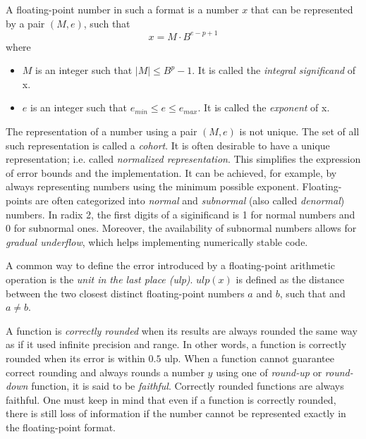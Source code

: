 A floating-point number in such a format is a number $x$ that can be represented by a pair $(M,e)$, such that
\begin{equation}
	x = M \cdot B^{e-p+1}
\end{equation}
where
\begin{itemize}
	\item $M$ is an integer such that $|M| \le B^{p}-1$. It is called the \textit{integral significand} of x.
	\item $e$ is an integer such that $e_{min} \le e \le e_{max}$. It is called the \textit{exponent} of x.
\end{itemize}
The representation of a number using a pair $(M, e)$ is not unique.
The set of all such representation is called a \textit{cohort}.
It is often desirable to have a unique representation; i.e.  called \textit{normalized representation}.
This simplifies the expression of error bounds and the implementation.
It can be achieved, for example, by always representing numbers using the minimum possible exponent.
Floating-points are often categorized into \textit{normal} and \textit{subnormal} (also called \textit{denormal}) numbers.
In radix 2, the first digits of a siginificand is 1 for normal numbers and 0 for subnormal ones.
Moreover, the availability of subnormal numbers allows for \textit{gradual underflow},
which helps implementing numerically stable code. 
				
A common way to define the error introduced by a floating-point arithmetic
operation is the \textit{unit in the last place (ulp)}.
 $ulp(x)$ is defined as the distance between the two closest distinct
floating-point numbers $a$ and $b$, such that  and $a \neq b$.

A function is \textit{correctly rounded} when its results are always rounded the 
same way as if it used infinite precision and range.
In other words, a function is correctly rounded when its error is within $0.5$ ulp.
When a function cannot guarantee correct rounding and always rounds a number $y$
using one of \textit{round-up} or \textit{round-down} function, it is said to be \textit{faithful}.
Correctly rounded functions are always faithful.
One must keep in mind that even if a function is correctly rounded, there is
still loss of information if the number cannot be represented exactly in the
floating-point format.
				
